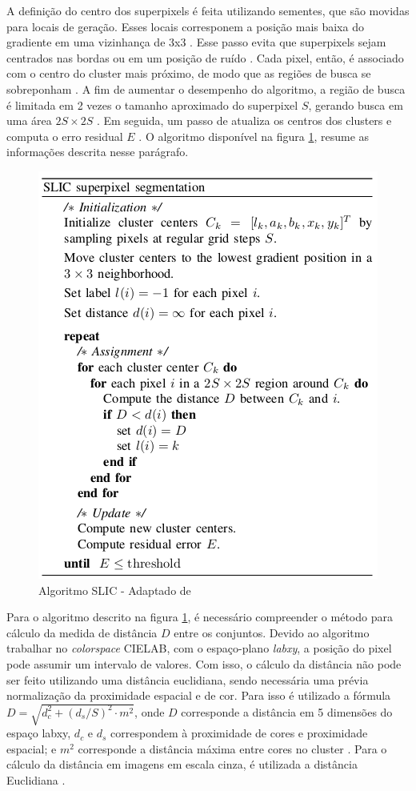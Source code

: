 \begin{document}
A definição do centro dos superpixels é feita utilizando sementes, que são movidas para locais de geração. Esses locais corresponem a posição mais baixa do gradiente em uma vizinhança de 3x3 \cite{SLIC}. Esse passo evita que superpixels sejam centrados nas bordas ou em um posição de ruído \cite{SLIC}. Cada pixel, então, é associado com o centro do cluster mais próximo, de modo que as regiões de busca se sobreponham \cite{SLIC}. A fim de aumentar o desempenho do algoritmo, a região de busca é limitada em 2 vezes o tamanho aproximado do superpixel $S$, gerando busca em uma área $2S \times 2S$ \cite{SLIC}. Em seguida, um passo de atualiza os centros dos clusters e computa o erro residual $E$ \cite{SLIC}. O algoritmo disponível na figura \ref{alg:SLIC}, resume as informações descrita nesse parágrafo.

\begin{figure}[ht]
\centering
\includegraphics[width=.6\textwidth]{algoritmo_slic.png}
\caption{Algoritmo SLIC - Adaptado de \cite{SLIC}}
\label{alg:SLIC}
\end{figure}

Para o algoritmo descrito na figura \ref{alg:SLIC}, é necessário compreender o método para cálculo da medida de distância $D$ entre os conjuntos. Devido ao algoritmo trabalhar no \textit{colorspace} CIELAB, com o espaço-plano \textit{labxy}, a posição do pixel pode assumir um intervalo de valores. Com isso, o cálculo da distância não pode ser feito utilizando uma distância euclidiana, sendo necessária uma prévia normalização da proximidade espacial e de cor. Para isso é utilizado a fórmula $D=\sqrt{d_c^2+(d_s/S)^2 \cdot m^2}$, onde $D$ corresponde a distância em 5 dimensões do espaço labxy, $d_c$ e $d_s$ correspondem à proximidade de cores e proximidade espacial; e $m^2$ corresponde a distância máxima entre cores no cluster \cite{SLIC}. Para o cálculo da distância em imagens em escala cinza, é utilizada a distância Euclidiana \cite{SLIC}.
\end{document}
